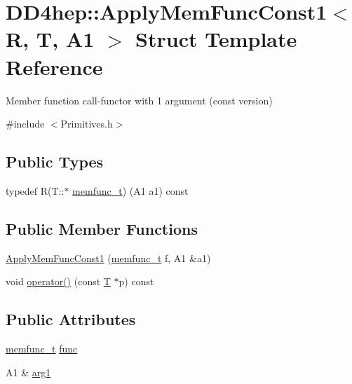 \hypertarget{struct_d_d4hep_1_1_apply_mem_func_const1}{}\section{D\+D4hep\+:\+:Apply\+Mem\+Func\+Const1$<$ R, T, A1 $>$ Struct Template Reference}
\label{struct_d_d4hep_1_1_apply_mem_func_const1}


Member function call-\/functor with 1 argument (const version)  




{\ttfamily \#include $<$Primitives.\+h$>$}

\subsection*{Public Types}
\begin{DoxyCompactItemize}
\item 
typedef R(T\+::$\ast$ \hyperlink{struct_d_d4hep_1_1_apply_mem_func_const1_ac708abd841ccaac1d1f920a5139b68ce}{memfunc\+\_\+t}) (A1 a1) const
\end{DoxyCompactItemize}
\subsection*{Public Member Functions}
\begin{DoxyCompactItemize}
\item 
\hyperlink{struct_d_d4hep_1_1_apply_mem_func_const1_a57b70099e8c5677710a247320b79c91c}{Apply\+Mem\+Func\+Const1} (\hyperlink{struct_d_d4hep_1_1_apply_mem_func_const1_ac708abd841ccaac1d1f920a5139b68ce}{memfunc\+\_\+t} f, A1 \&a1)
\item 
void \hyperlink{struct_d_d4hep_1_1_apply_mem_func_const1_a9d76abcb9c2a7df2c8764b2cd3de6397}{operator()} (const \hyperlink{class_t}{T} $\ast$p) const
\end{DoxyCompactItemize}
\subsection*{Public Attributes}
\begin{DoxyCompactItemize}
\item 
\hyperlink{struct_d_d4hep_1_1_apply_mem_func_const1_ac708abd841ccaac1d1f920a5139b68ce}{memfunc\+\_\+t} \hyperlink{struct_d_d4hep_1_1_apply_mem_func_const1_a924d23a16a5ec30552a0f78bcc3dee14}{func}
\item 
A1 \& \hyperlink{struct_d_d4hep_1_1_apply_mem_func_const1_a3bcafdc6a0f9deeb47c46e2a10b4fbe2}{arg1}
\end{DoxyCompactItemize}


